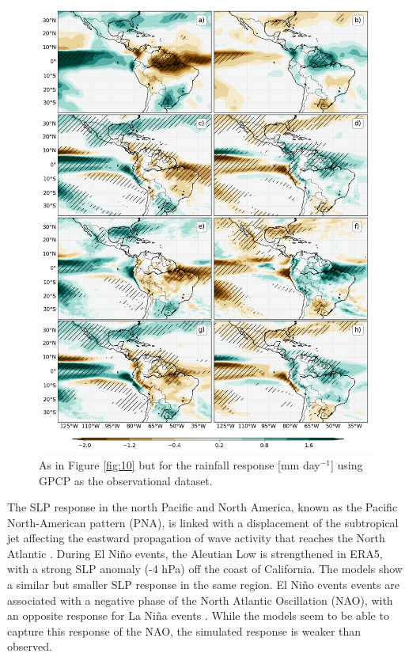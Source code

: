
\begin{figure}[t!]
\centering
 \includegraphics[width=0.81\linewidth]{figures/ensopr_3}
 \caption[ENSO precipitation teleconnections to the AMS]{As in Figure \ref{fig:10} but for the rainfall response [mm day$^{-1}$] using GPCP as the observational dataset.}
\label{fig:11}
\end{figure}

The SLP response in the north Pacific and North America, known as the Pacific North-American pattern (PNA), is linked with a displacement of the subtropical jet affecting the eastward propagation of wave activity that reaches the North Atlantic  \citep[e.g.][]{bayr2019,jimenezesteve2020}.
During  El Ni\~no events, the Aleutian Low is strengthened in ERA5, with a strong SLP anomaly (-4 hPa) off the coast of California. The models show a similar but smaller SLP response in the same region.  El Ni\~no events events are associated with a negative phase of the North Atlantic Oscillation (NAO), with an opposite response for La Ni\~na events \citep{fereday2020}. While the models seem to be able to capture this response of the NAO, the simulated response is weaker than observed.  




